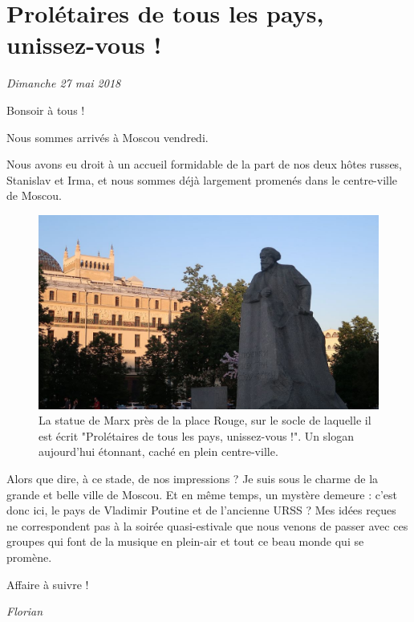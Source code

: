 \hypertarget{proluxe9taires-de-tous-les-pays-unissez-vous}{%
\section{Prolétaires de tous les pays, unissez-vous
!}\label{proluxe9taires-de-tous-les-pays-unissez-vous}}

\emph{Dimanche 27 mai 2018}

Bonsoir à tous !

Nous sommes arrivés à Moscou vendredi.

Nous avons eu droit à un accueil formidable de la part de nos deux hôtes
russes, Stanislav et Irma, et nous sommes déjà largement promenés dans
le centre-ville de Moscou.

\begin{figure}
\centering
\includegraphics{images/20180527_marx.JPG}
\caption{La statue de Marx près de la place Rouge, sur le socle de
laquelle il est écrit "Prolétaires de tous les pays, unissez-vous !". Un
slogan aujourd'hui étonnant, caché en plein centre-ville.}
\end{figure}

Alors que dire, à ce stade, de nos impressions ? Je suis sous le charme
de la grande et belle ville de Moscou. Et en même temps, un mystère
demeure : c'est donc ici, le pays de Vladimir Poutine et de l'ancienne
URSS ? Mes idées reçues ne correspondent pas à la soirée quasi-estivale
que nous venons de passer avec ces groupes qui font de la musique en
plein-air et tout ce beau monde qui se promène.

Affaire à suivre !

\emph{Florian}
